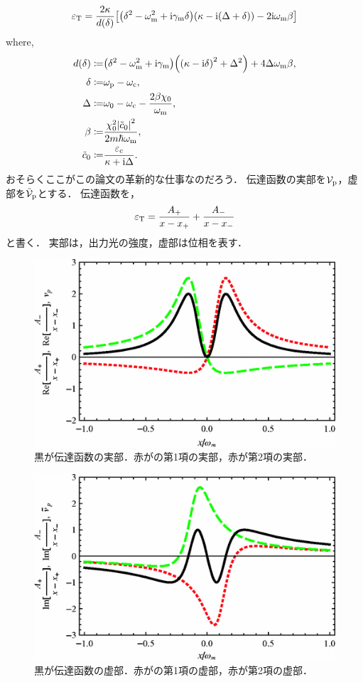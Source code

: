 \documentclass{report}
\begin{document}
      \begin{align}
        \varepsilon_{\mathrm{T}} = \frac{2\kappa}{d(\delta)}\qty[\qty(\delta^2 - \omega^2_{\mathrm{m}} + \mathrm{i}\gamma_{\mathrm{m}}\delta)\qty(\kappa - \mathrm{i}\qty(\Delta + \delta)) - 2\mathrm{i}\omega_{\mathrm{m}}\beta] \\ 
      \end{align}
      where,
      \begin{align}
        d(\delta) \coloneqq& \qty(\delta^2 - \omega^2_{\mathrm{m}} + \mathrm{i}\gamma_{\mathrm{m}})\qty(\qty(\kappa - \mathrm{i}\delta)^2 + \Delta^2) + 4\Delta\omega_{\mathrm{m}}\beta, \\ 
        \delta \coloneqq& \omega_{\mathrm{p}} - \omega_{\mathrm{c}}, \\ 
        \Delta \coloneqq& \omega_0 - \omega_{\mathrm{c}} - \frac{2\beta\chi_0}{\omega_{\mathrm{m}}}, \\ 
        \beta \coloneqq& \frac{\chi^2_0\abs{\tilde{c}_0}^2}{2m\hbar\omega_{\mathrm{m}}}, \\ 
        \tilde{c}_0 \coloneqq& \frac{\varepsilon_{\mathrm{c}}}{\kappa + \mathrm{i}\Delta}.
      \end{align}
      おそらくここがこの論文の革新的な仕事なのだろう．
      伝達函数の実部を$\mathcal{V}_{\mathrm{p}}$，虚部を$\tilde{\mathcal{V}}_{\mathrm{p}}$とする．
      伝達函数を，
      \begin{align}
        \varepsilon_{\mathrm{T}} = \frac{A_+}{x - x_+} + \frac{A_-}{x - x_-} \label{PhysRevA.81.041803-trans}
      \end{align}
      と書く．
      実部は，出力光の強度，虚部は位相を表す．
      \begin{figure}[H]
        \centering
        \includegraphics[width = 0.5\linewidth]{./src/Electromagnetically_induced_transparency_in_mechanical_effects_of_light/4.png}
        \caption{黒が伝達函数の実部．赤がの第1項の実部，赤が第2項の実部．}
      \end{figure}
      \begin{figure}[H]
        \centering
        \includegraphics[width = 0.5\linewidth]{./src/Electromagnetically_induced_transparency_in_mechanical_effects_of_light/5.png}
        \caption{黒が伝達函数の虚部．赤がの第1項の虚部，赤が第2項の虚部．}
      \end{figure}
  \appendix
\end{document}
